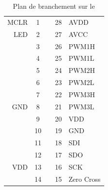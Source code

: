 \begin{table}[h]
\begin{multicols}{2}
\begin{center}
			
			\begin{footnotesize}
				\begin{tabular}{r|ccc|l}
				MCLR 	& 1 &    & 28 & AVDD 	\\ 
				LED  	& 2 &    & 27 & AVCC 	\\ 
				  		& 3 &    & 26 & PWM1H	\\
				  		& 4 &    & 25 & PWM1L	\\ 
				  		& 5 &    & 24 & PWM2H	\\ 
				  		& 6 &    & 23 & PWM2L  	\\ 
				 		& 7 &    & 22 & PWM3H  	\\ 
				GND 	& 8 &    & 21 & PWM3L  	\\ 
				  		& 9 &    & 20 & VDD 	\\ 
				  		& 10 &   & 19 & GND 	\\ 
				  		& 11 &   & 18 & SDI 	\\ 
				  		& 12 &   & 17 & SDO 	\\ 
				VDD 	& 13 &   & 16 & SCK 	\\ 
				  		& 14 &   & 15 & Zero Cross\\ 
				\end{tabular} 
			\end{footnotesize}
			\caption{Plan de branchement sur le \dspic}
			\label{pinoutdspic}
			\end{center}
			\end{multicols}
		\end{table}


